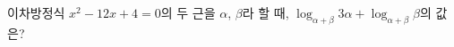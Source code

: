 이차방정식 $x^2-12x+4=0$의 두 근을 $\alpha$, $\beta$라 할 때, $\log_{\alpha+\beta} 3\alpha+\log_{\alpha+\beta} \beta$의 값은?
